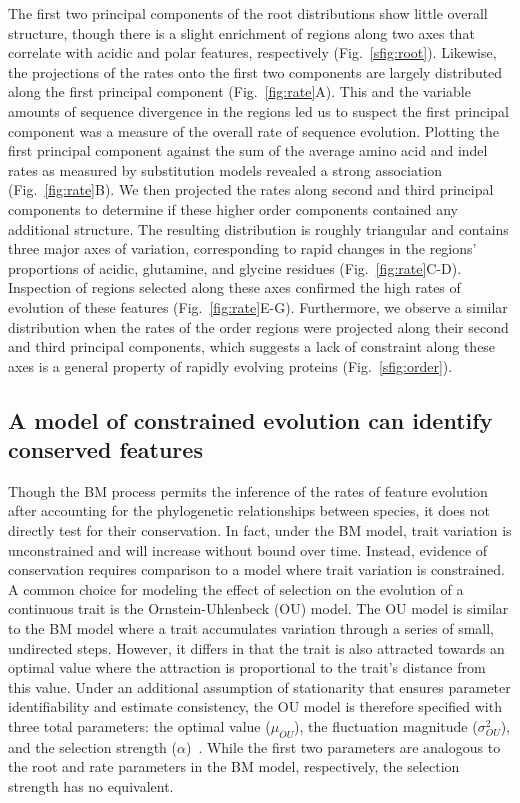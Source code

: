 The first two principal components of the root distributions show little overall structure, though there is a slight enrichment of regions along two axes that correlate with acidic and polar features, respectively (Fig.~\ref{sfig:root}). Likewise, the projections of the rates onto the first two components are largely distributed along the first principal component (Fig.~\ref{fig:rate}A). This and the variable amounts of sequence divergence in the regions led us to suspect the first principal component was a measure of the overall rate of sequence evolution. Plotting the first principal component against the sum of the average amino acid and indel rates as measured by substitution models revealed a strong association (Fig.~\ref{fig:rate}B). We then projected the rates along second and third principal components to determine if these higher order components contained any additional structure. The resulting distribution is roughly triangular and contains three major axes of variation, corresponding to rapid changes in the regions' proportions of acidic, glutamine, and glycine residues (Fig.~\ref{fig:rate}C-D). Inspection of regions selected along these axes confirmed the high rates of evolution of these features (Fig.~\ref{fig:rate}E-G). Furthermore, we observe a similar distribution when the rates of the order regions were projected along their second and third principal components, which suggests a lack of constraint along these axes is a general property of rapidly evolving proteins (Fig.~\ref{sfig:order}).

\subsection{A model of constrained evolution can identify conserved features}
Though the BM process permits the inference of the rates of feature evolution after accounting for the phylogenetic relationships between species, it does not directly test for their conservation. In fact, under the BM model, trait variation is unconstrained and will increase without bound over time. Instead, evidence of conservation requires comparison to a model where trait variation is constrained. A common choice for modeling the effect of selection on the evolution of a continuous trait is the Ornstein-Uhlenbeck (OU) model. The OU model is similar to the BM model where a trait accumulates variation through a series of small, undirected steps. However, it differs in that the trait is also attracted towards an optimal value where the attraction is proportional to the trait's distance from this value. Under an additional assumption of stationarity that ensures parameter identifiability and estimate consistency, the OU model is therefore specified with three total parameters: the optimal value ($\mu_{OU}$), the fluctuation magnitude ($\sigma^2_{OU}$), and the selection strength ($\alpha$)~\cite{Ho2013, Ho2014}. While the first two parameters are analogous to the root and rate parameters in the BM model, respectively, the selection strength has no equivalent.

